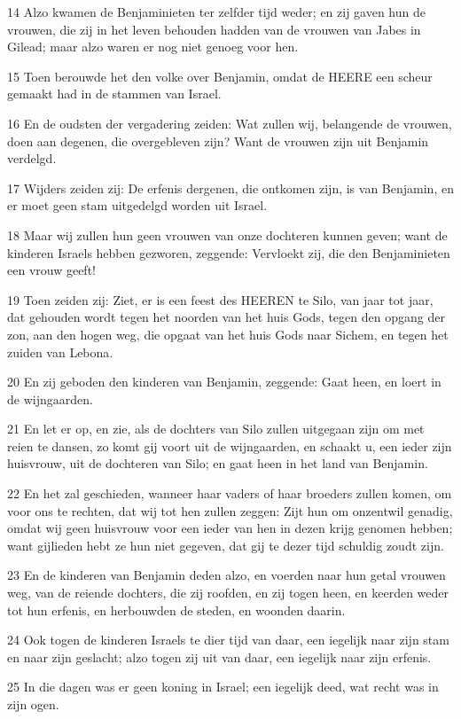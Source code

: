 \par 14 Alzo kwamen de Benjaminieten ter zelfder tijd weder; en zij gaven hun de vrouwen, die zij in het leven behouden hadden van de vrouwen van Jabes in Gilead; maar alzo waren er nog niet genoeg voor hen.
\par 15 Toen berouwde het den volke over Benjamin, omdat de HEERE een scheur gemaakt had in de stammen van Israel.
\par 16 En de oudsten der vergadering zeiden: Wat zullen wij, belangende de vrouwen, doen aan degenen, die overgebleven zijn? Want de vrouwen zijn uit Benjamin verdelgd.
\par 17 Wijders zeiden zij: De erfenis dergenen, die ontkomen zijn, is van Benjamin, en er moet geen stam uitgedelgd worden uit Israel.
\par 18 Maar wij zullen hun geen vrouwen van onze dochteren kunnen geven; want de kinderen Israels hebben gezworen, zeggende: Vervloekt zij, die den Benjaminieten een vrouw geeft!
\par 19 Toen zeiden zij: Ziet, er is een feest des HEEREN te Silo, van jaar tot jaar, dat gehouden wordt tegen het noorden van het huis Gods, tegen den opgang der zon, aan den hogen weg, die opgaat van het huis Gods naar Sichem, en tegen het zuiden van Lebona.
\par 20 En zij geboden den kinderen van Benjamin, zeggende: Gaat heen, en loert in de wijngaarden.
\par 21 En let er op, en zie, als de dochters van Silo zullen uitgegaan zijn om met reien te dansen, zo komt gij voort uit de wijngaarden, en schaakt u, een ieder zijn huisvrouw, uit de dochteren van Silo; en gaat heen in het land van Benjamin.
\par 22 En het zal geschieden, wanneer haar vaders of haar broeders zullen komen, om voor ons te rechten, dat wij tot hen zullen zeggen: Zijt hun om onzentwil genadig, omdat wij geen huisvrouw voor een ieder van hen in dezen krijg genomen hebben; want gijlieden hebt ze hun niet gegeven, dat gij te dezer tijd schuldig zoudt zijn.
\par 23 En de kinderen van Benjamin deden alzo, en voerden naar hun getal vrouwen weg, van de reiende dochters, die zij roofden, en zij togen heen, en keerden weder tot hun erfenis, en herbouwden de steden, en woonden daarin.
\par 24 Ook togen de kinderen Israels te dier tijd van daar, een iegelijk naar zijn stam en naar zijn geslacht; alzo togen zij uit van daar, een iegelijk naar zijn erfenis.
\par 25 In die dagen was er geen koning in Israel; een iegelijk deed, wat recht was in zijn ogen.


